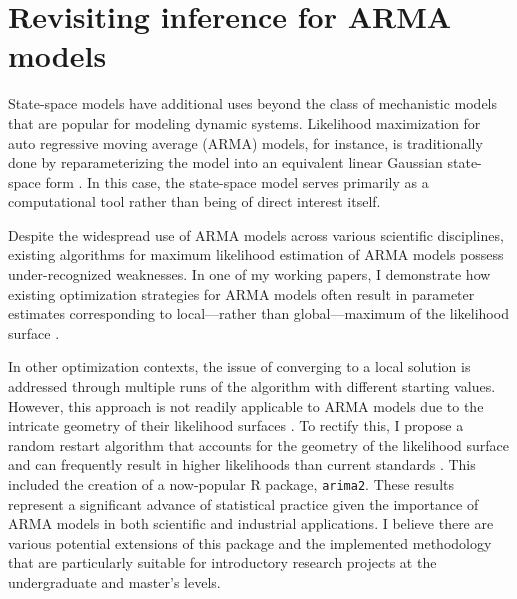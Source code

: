 \documentclass{article}
\begin{document}

\section{Revisiting inference for ARMA models}

State-space models have additional uses beyond the class of mechanistic models that are popular for modeling dynamic systems.
Likelihood maximization for auto regressive moving average (ARMA) models, for instance, is traditionally done by reparameterizing the model into an equivalent linear Gaussian state-space form \cite{gardner80, durbin12}.
In this case, the state-space model serves primarily as a computational tool rather than being of direct interest itself.

Despite the widespread use of ARMA models across various scientific disciplines, existing algorithms for maximum likelihood estimation of ARMA models possess under-recognized weaknesses.
In one of my working papers, I demonstrate how existing optimization strategies for ARMA models often result in parameter estimates corresponding to local---rather than global---maximum of the likelihood surface \cite{wheelerARMA}.

In other optimization contexts, the issue of converging to a local solution is addressed through multiple runs of the algorithm with different starting values.
However, this approach is not readily applicable to ARMA models due to the intricate geometry of their likelihood surfaces \cite{ripley2002}.
To rectify this, I propose a random restart algorithm that accounts for the geometry of the likelihood surface and can frequently result in higher likelihoods than current standards \cite{wheelerARMA}.
This included the creation of a now-popular R package, \texttt{arima2}.
These results represent a significant advance of statistical practice given the importance of ARMA models in both scientific and industrial applications.
I believe there are various potential extensions of this package and the implemented methodology that are particularly suitable for introductory research projects at the undergraduate and master's levels.
\end{document}

